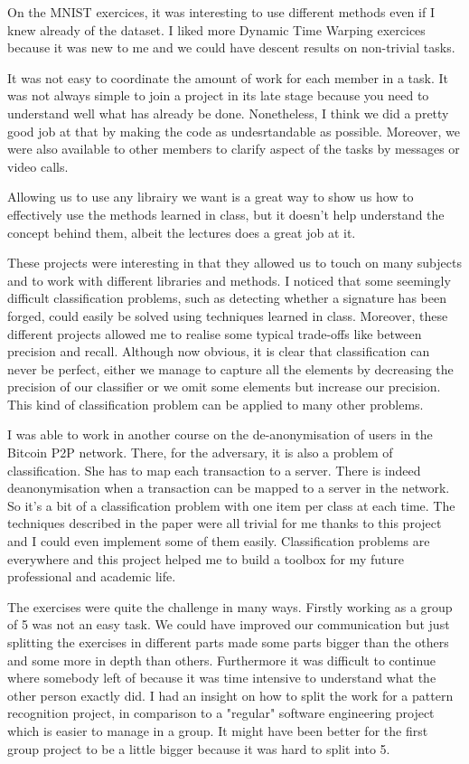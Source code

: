 \documentclass{homework}
\begin{document}
On the MNIST exercices, it was interesting to use different methods even if I knew already of the dataset. I liked more Dynamic Time Warping exercices because it was new to me and we could have descent results on non-trivial tasks. 

It was not easy to coordinate the amount of work for each member in a task. It was not always simple to join a project in its late stage because you need to understand well what has already be done. Nonetheless, I think we did a pretty good job at that by making the code as undesrtandable as possible. Moreover, we were also available to other members to clarify aspect of the tasks by messages or video calls.

Allowing us to use any librairy we want is a great way to show us how to effectively use the methods learned in class, but it doesn't help understand the concept behind them, albeit the lectures does a great job at it.

These projects were interesting in that they allowed us to touch on many subjects and to work with different libraries and methods. I noticed that some seemingly difficult classification problems, such as detecting whether a signature has been forged, could easily be solved using techniques learned in class. Moreover, these different projects allowed me to realise some typical trade-offs like between precision and recall. Although now obvious, it is clear that classification can never be perfect, either we manage to capture all the elements by decreasing the precision of our classifier or we omit some elements but increase our precision. This kind of classification problem can be applied to many other problems.

I was able to work in another course on the de-anonymisation of users in the Bitcoin P2P network. There, for the adversary, it is also a problem of classification. She has to map each transaction to a server. There is indeed deanonymisation when a transaction can be mapped to a server in the network. So it's a bit of a classification problem with one item per class at each time. The techniques described in the paper were all trivial for me thanks to this project and I could even implement some of them easily. Classification problems are everywhere and this project helped me to build a toolbox for my future professional and academic life.

The exercises were quite the challenge in many ways. Firstly working as a group of 5 was not an easy task. We could have improved our communication but just splitting the exercises in different parts made some parts bigger than the others and some more in depth than others. Furthermore it was difficult to continue where somebody left of because it was time intensive to understand what the other person exactly did. I had an insight on how to split the work for a pattern recognition project, in comparison to a "regular" software engineering project which is easier to manage in a group. It might have been better for the first group project to be a little bigger because it was hard to split into 5. 
\end{document}
